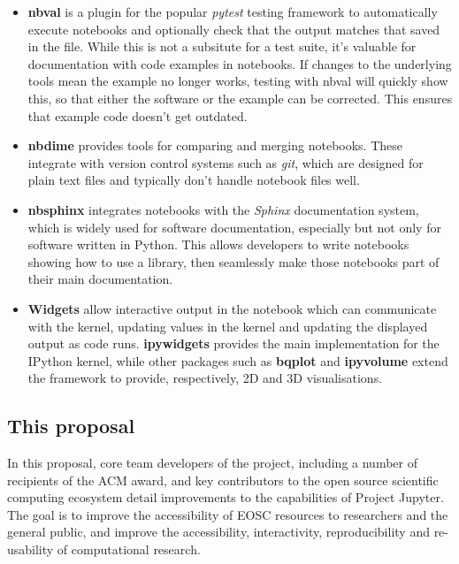 \begin{itemize}
  \item \textbf{nbval} \cite{nbval} is a plugin for the popular \emph{pytest} testing
  framework to automatically execute notebooks and optionally check that the
  output matches that saved in the file. While this is not a subsitute for a
  test suite, it's valuable for documentation with code examples in notebooks.
  If changes to the underlying tools mean the example no longer
  works, testing with nbval will quickly show this, so that either the software
  or the example can be corrected. This ensures that example code doesn't
  get outdated.

  \item \textbf{nbdime} \cite{nbdime} provides tools for comparing and merging notebooks.
  These integrate with version control systems such as \emph{git}, which
  are designed for plain text files and typically don't handle notebook files
  well.

  \item \textbf{nbsphinx} \cite{Nbsphinx} integrates notebooks with the \emph{Sphinx}
  documentation system, which is widely used for software documentation,
  especially but not only for software written in Python.
  This allows developers to write notebooks showing how to use a library,
  then seamlessly make those notebooks part of their main documentation.

  \item \textbf{Widgets} allow interactive output in the notebook which can
  communicate with the kernel, updating values in the kernel and updating the
  displayed output as code runs. \textbf{ipywidgets} \cite{ipywidgets} provides the main
  implementation for the IPython kernel, while other packages such as
  \textbf{bqplot} \cite{bqplot} and \textbf{ipyvolume} \cite{ipyvolume}
  extend the framework to provide, respectively, 2D and 3D visualisations.
\end{itemize}

\subsection{This proposal}

In this proposal, core team developers of the project, including a
number of recipients of the ACM award, and key contributors to the
open source scientific computing ecosystem detail improvements to the
capabilities of Project Jupyter.  The goal is to improve the
accessibility of EOSC resources to researchers and the general public,
and improve the accessibility, interactivity, reproducibility and
re-usability of computational research.

